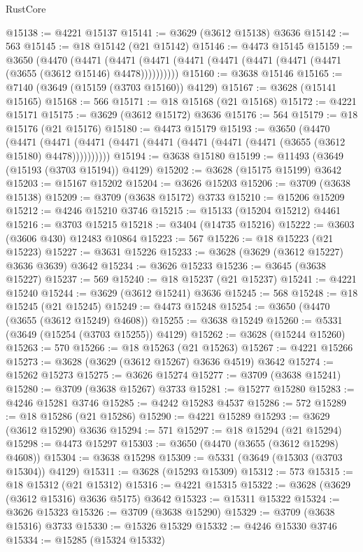\begin{lexlean}{RustCore}
\begin{coremodule}
@15138 := @4221 @15137
@15141 := @3629 (@3612 @15138) @3636
@15142 := 563
@15145 := @18 @15142 (@21 @15142)
@15146 := @4473 @15145
@15159 := @3650
    (@4470
      (@4471 (@4471 (@4471 (@4471 (@4471 (@4471 (@4471 (@4471 (@3655 (@3612 @15146) @4478))))))))))
@15160 := @3638 @15146
@15165 := @7140 (@3649 (@15159 (@3703 @15160)) @4129)
@15167 := @3628 (@15141 @15165)
@15168 := 566
@15171 := @18 @15168 (@21 @15168)
@15172 := @4221 @15171
@15175 := @3629 (@3612 @15172) @3636
@15176 := 564
@15179 := @18 @15176 (@21 @15176)
@15180 := @4473 @15179
@15193 := @3650
    (@4470
      (@4471 (@4471 (@4471 (@4471 (@4471 (@4471 (@4471 (@4471 (@3655 (@3612 @15180) @4478))))))))))
@15194 := @3638 @15180
@15199 := @11493 (@3649 (@15193 (@3703 @15194)) @4129)
@15202 := @3628 (@15175 @15199) @3642
@15203 := @15167 @15202
@15204 := @3626 @15203
@15206 := @3709 (@3638 @15138)
@15209 := @3709 (@3638 @15172) @3733
@15210 := @15206 @15209
@15212 := @4246 @15210 @3746
@15215 := @15133 (@15204 @15212) @4461
@15216 := @3703 @15215
@15218 := @3404 (@14735 @15216)
@15222 := @3603 (@3606 @430) @12483 @10864
@15223 := 567
@15226 := @18 @15223 (@21 @15223)
@15227 := @3631 @15226
@15233 := @3628 (@3629 (@3612 @15227) @3636 @3639) @3642
@15234 := @3626 @15233
@15236 := @3645 (@3638 @15227)
@15237 := 569
@15240 := @18 @15237 (@21 @15237)
@15241 := @4221 @15240
@15244 := @3629 (@3612 @15241) @3636
@15245 := 568
@15248 := @18 @15245 (@21 @15245)
@15249 := @4473 @15248
@15254 := @3650 (@4470 (@3655 (@3612 @15249) @4608))
@15255 := @3638 @15249
@15260 := @5331 (@3649 (@15254 (@3703 @15255)) @4129)
@15262 := @3628 (@15244 @15260)
@15263 := 570
@15266 := @18 @15263 (@21 @15263)
@15267 := @4221 @15266
@15273 := @3628 (@3629 (@3612 @15267) @3636 @4519) @3642
@15274 := @15262 @15273
@15275 := @3626 @15274
@15277 := @3709 (@3638 @15241)
@15280 := @3709 (@3638 @15267) @3733
@15281 := @15277 @15280
@15283 := @4246 @15281 @3746
@15285 := @4242 @15283 @4537
@15286 := 572
@15289 := @18 @15286 (@21 @15286)
@15290 := @4221 @15289
@15293 := @3629 (@3612 @15290) @3636
@15294 := 571
@15297 := @18 @15294 (@21 @15294)
@15298 := @4473 @15297
@15303 := @3650 (@4470 (@3655 (@3612 @15298) @4608))
@15304 := @3638 @15298
@15309 := @5331 (@3649 (@15303 (@3703 @15304)) @4129)
@15311 := @3628 (@15293 @15309)
@15312 := 573
@15315 := @18 @15312 (@21 @15312)
@15316 := @4221 @15315
@15322 := @3628 (@3629 (@3612 @15316) @3636 @5175) @3642
@15323 := @15311 @15322
@15324 := @3626 @15323
@15326 := @3709 (@3638 @15290)
@15329 := @3709 (@3638 @15316) @3733
@15330 := @15326 @15329
@15332 := @4246 @15330 @3746
@15334 := @15285 (@15324 @15332)

\end{coremodule}
\end{lexlean}
